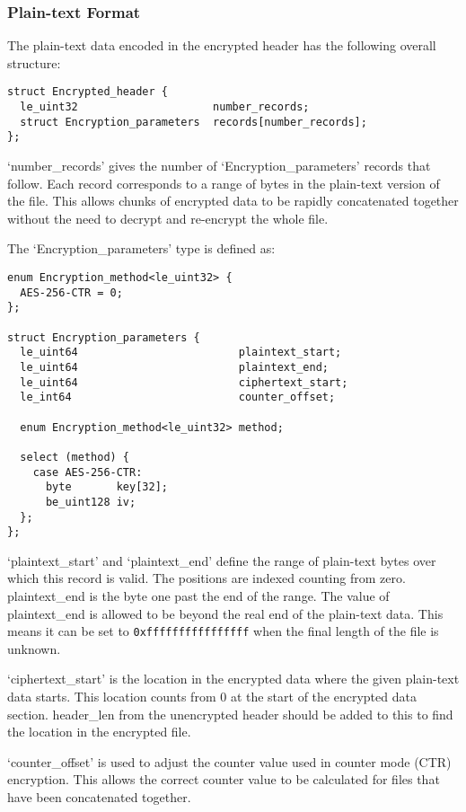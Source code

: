 \documentclass[10pt]{article}
\begin{document}
\subsubsection{Plain-text Format}
The plain-text data encoded in the encrypted header has the following overall structure:
\begin{verbatim}
struct Encrypted_header {
  le_uint32                     number_records;
  struct Encryption_parameters  records[number_records];
};
\end{verbatim}

`number\_records' gives the number of `Encryption\_parameters' records that follow.
Each record corresponds to a range of bytes in the plain-text version of the file.
This allows chunks of encrypted data to be rapidly concatenated together without the need to decrypt and re-encrypt the
whole file.

The `Encryption\_parameters' type is defined as:

\begin{verbatim}
enum Encryption_method<le_uint32> {
  AES-256-CTR = 0;
};

struct Encryption_parameters {
  le_uint64                         plaintext_start;
  le_uint64                         plaintext_end;
  le_uint64                         ciphertext_start;
  le_int64                          counter_offset;

  enum Encryption_method<le_uint32> method;

  select (method) {
    case AES-256-CTR:
      byte       key[32];
      be_uint128 iv;
  };
};
\end{verbatim}

`plaintext\_start' and `plaintext\_end' define the range of plain-text bytes over which this record is valid.
The positions are indexed counting from zero.
plaintext\_end is the byte one past the end of the range.
The value of plaintext\_end is allowed to be beyond the real end of the plain-text data.
This means it can be set to \verb+0xffffffffffffffff+ when the final length of the file is unknown.

`ciphertext\_start' is the location in the encrypted data where the given plain-text data starts.
This location counts from 0 at the start of the encrypted data section.
header\_len from the unencrypted header should be added to this to find the location in the encrypted file.

`counter\_offset' is used to adjust the counter value used in counter mode (CTR) encryption.
This allows the correct counter value to be calculated for files that have been concatenated together.
\end{document}
